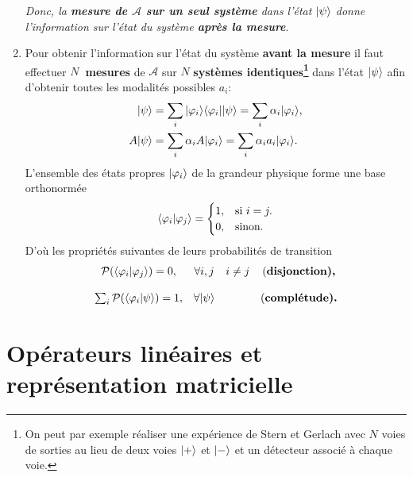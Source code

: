 \begin{enumerate}
\medskip
\colorbox[gray]{0.8}{
\parbox[c]{0.9\textwidth}{
\emph{Donc, la \textbf{mesure de $\mathcal{A}$ sur un seul système} dans l'état
$\vert\psi\rangle$ donne l'information sur l'état du système \textbf{après la
mesure}}.
}}

\item Pour obtenir l'information sur l'état du système \textbf{avant la mesure}
il faut effectuer $N$\textbf{\ mesures} de $\mathcal{A}$ sur $N$
\textbf{systèmes identiques\footnote{On peut par exemple réaliser une expérience
de Stern et Gerlach avec $N$ voies de sorties au lieu de deux voies $\vert+\rangle$ et
$\vert-\rangle$ et un détecteur associé à chaque voie.}} dans l'état $\vert\psi\rangle $
afin d'obtenir toutes les modalités possibles $a_{i}$:%
\begin{subequations}
\begin{align}
\vert\psi\rangle  &  =\sum_{i}\vert\varphi_{i}\rangle\langle\varphi_{i}\vert\vert\psi\rangle
=\sum_{i}\alpha_{i}\vert\varphi_{i}\rangle,\label{eq:Proj1}\\
A\vert\psi\rangle  & =\sum_{i}\alpha_{i}A\vert\varphi_{i}\rangle
=\sum_{i}\alpha_{i}a_{i}\vert\varphi_{i}\rangle.
\end{align}%
\end{subequations}%
L'ensemble des états propres $\vert\varphi_{i}\rangle$ de la grandeur physique forme
une base orthonormée
\begin{equation}
\langle\varphi_{i}\ket{\varphi_{j}}=\begin{cases}
1, & \text{si }i=j.\\
0, & \text{sinon.}%
\end{cases}
\end{equation}
D'où les propriétés suivantes de leurs probabilités de transition%
\begin{equation}%
\begin{array}
[c]{cccc}%
\mathcal{P}(\langle\varphi_{i}\ket{\varphi_{j}})=0, & \forall i,j &
i\neq j & \text{(\textbf{disjonction),}}\\
&  &  & \\
\sum_{i}\mathcal{P}(\langle\varphi_{i}\ket{\psi})=1, & \forall\ket{\psi}  &  &
\text{(\textbf{complétude).}}%
\end{array}
\end{equation}
\end{enumerate}


\section{Opérateurs linéaires et représentation matricielle}
\label{sec:OOL}

